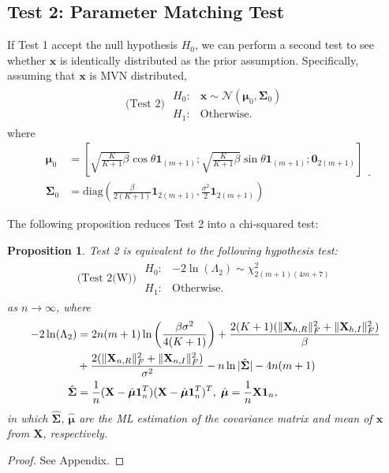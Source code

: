 \documentclass[journal,draftcls,onecolumn,12pt,twoside]{IEEEtran}
\newtheorem{proposition}{Proposition}
\begin{document}
\subsection{Test 2: Parameter Matching Test}
If Test 1 accept the null hypothesis $H_0$, we can
perform a second test to see whether $\mathbf{x}$ is identically distributed as
the prior assumption. Specifically, assuming that $\mathbf{x}$ is MVN distributed,
\begin{align}
  \mbox{(Test 2) } \begin{array}{ll}H_0: & \mathbf{x}\sim
  \mathcal{N}(\bm{\mu}_0, \mathbf{\Sigma}_0) \\ H_1: &
  \mbox{Otherwise.}
  \end{array}
\end{align}
where
\begin{subequations}
  \begin{align}
    \bm{\mu}_0 & =
    \left[\sqrt{\frac{K}{K+1}\beta}\cos\theta\mathbf{1}_{(m+1)};
    \sqrt{\frac{K}{K+1}\beta}\sin\theta\mathbf{1}_{(m+1)};
    \mathbf{0}_{2(m+1)}\right]
    \\
    \mathbf{\Sigma}_0 & =
    \mbox{diag}\left(\frac{\beta}{2(K+1)}\mathbf{1}_{2(m+1)},
    \frac{\sigma^2}{2}\mathbf{1}_{2(m+1)}\right) 
  \end{align}.
  \label{eq:mu0Sigma0}
\end{subequations}


The following proposition reduces Test 2 into a chi-squared test:
\begin{proposition}
  \label{prop:test2}
  Test 2 is equivalent to the following hypothesis test:
  \begin{align}
    \mbox{(Test 2(W)) } \begin{array}{ll}H_0: & -2\ln(\Lambda_2) \sim
    \chi_{2(m+1)(4m+7)}^2 \\ H_1: & \mbox{Otherwise.}
    \end{array}
  \end{align}
  as $n\rightarrow\infty$, where
  \begin{align}
    -2\ln(\Lambda_2) & =
    2n(m+1)\ln\left(\frac{\beta\sigma^2}{4(K+1)}\right)
    +
    \frac{2(K+1)(\|\mathbf{X}_{h,R}\|_F^2 + \|\mathbf{X}_{h,I}\|_F^2)}{\beta}
    \notag \\ &+
    \frac{2(\|\mathbf{X}_{n,R}\|_F^2 + \|\mathbf{X}_{n,I}\|_F^2)}{\sigma^2}
    - n\ln|\hat{\mathbf{\Sigma}}| - 4n(m+1)\\
    \hat{\mathbf{\Sigma}} & = \frac{1}{n}(\mathbf{X}
    -\hat{\bm{\mu}}\mathbf{1}_n^T)(\mathbf{X}
    -\hat{\bm{\mu}}\mathbf{1}_n^T)^T,\;\hat{\bm{\mu}} =
    \frac{1}{n}\mathbf{X}\mathbf{1}_n,\label{eq:sigma_mu_ml}
  \end{align}
  in which $\hat{\bm{\Sigma}}$, $\hat{\bm{\mu}}$ are the ML estimation of the
  covariance matrix and mean of $\mathbf{x}$ from $\mathbf{X}$, respectively.
\end{proposition}
\begin{proof}
  See Appendix.
\end{proof}
\end{document}

